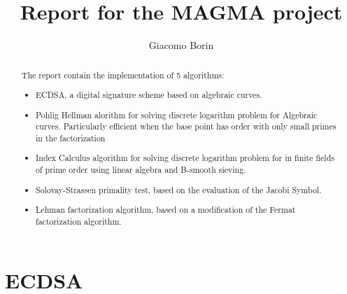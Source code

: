 \documentclass{article}
\title{Report for the MAGMA project}
\author{Giacomo Borin}
\theoremstyle{plain}
\theoremstyle{remark}
\theoremstyle{definition}
\begin{document}
\maketitle

\begin{abstract}
	The report contain the implementation of 5 algorithms:
	\begin{itemize}
		\item ECDSA, a digital signature scheme based on algebraic curves.
		\item Pohlig Hellman alorithm for solving discrete logarithm problem for Algebraic curves. Particularly efficient when the base point has order with only small primes in the factorization
		\item Index Calculus algorithm for solving discrete logarithm problem for in finite fields of prime order using linear algebra and B-smooth sieving.
		\item Solovay-Strassen primality test, based on the evaluation of the Jacobi Symbol.
		\item Lehman factorization algorithm, based on a modification of the Fermat factorization algorithm.
	\end{itemize}

\end{abstract}


\section{ECDSA}

%

\end{document}
